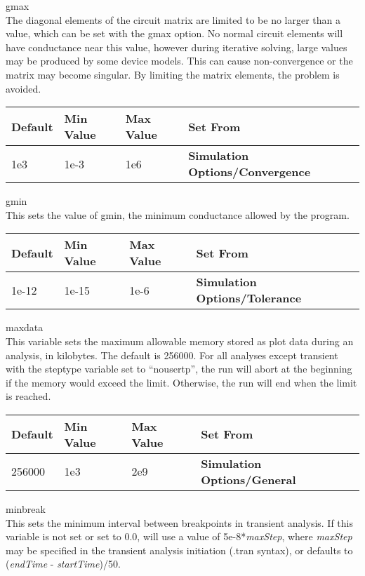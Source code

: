 \begin{description}
\item{\et gmax}\\
The diagonal elements of the circuit matrix are limited to be no
larger than a value, which can be set with the {\et gmax} option.  No
normal circuit elements will have conductance near this value, however
during iterative solving, large values may be produced by some device
models.  This can cause non-convergence or the matrix may become
singular.  By limiting the matrix elements, the problem is avoided.

\begin{tabular}{|l|l|l|l|}\hline
\bf Default & \bf Min Value & \bf Max Value & \bf Set From\\ \hline
1e3 & 1e-3 & 1e6 & \bf Simulation Options/Convergence\\ \hline
\end{tabular}

\item{\et gmin}\\
This sets the value of {\vt gmin}, the minimum conductance allowed by the
program.

\begin{tabular}{|l|l|l|l|}\hline
\bf Default & \bf Min Value & \bf Max Value & \bf Set From\\ \hline
1e-12 & 1e-15 & 1e-6 & \bf Simulation Options/Tolerance\\ \hline
\end{tabular}

\item{\et maxdata}\\
This variable sets the maximum allowable memory stored as plot data
during an analysis, in kilobytes.  The default is 256000.  For all
analyses except transient with the {\et steptype} variable set to
``{\vt nousertp}'', the run will abort at the beginning if the memory
would exceed the limit.  Otherwise, the run will end when the limit is
reached.

\begin{tabular}{|l|l|l|l|}\hline
\bf Default & \bf Min Value & \bf Max Value & \bf Set From\\ \hline
256000 & 1e3 & 2e9 & \bf Simulation Options/General\\ \hline
\end{tabular}

\item{\et minbreak}\\
This sets the minimum interval between breakpoints in transient
analysis.  If this variable is not set or set to 0.0, {\WRspice} will
use a value of 5e-8*{\it maxStep}, where {\it maxStep} may be
specified in the transient analysis initiation ({\vt .tran} syntax),
or defaults to ({\it endTime} - {\it startTime\/})/50.


\end{description}

